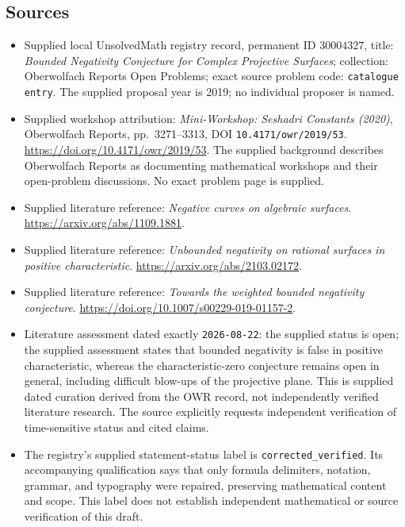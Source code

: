 \documentclass[11pt]{article}
\begin{document}
\subsection{Sources}
\begin{itemize}
\item Supplied local UnsolvedMath registry record, permanent ID \(30004327\), title: \emph{Bounded Negativity Conjecture for Complex Projective Surfaces}; collection: Oberwolfach Reports Open Problems; exact source problem code: \texttt{catalogue entry}. The supplied proposal year is 2019; no individual proposer is named.
\item Supplied workshop attribution: \emph{Mini-Workshop: Seshadri Constants (2020)}, Oberwolfach Reports, pp.\ 3271--3313, DOI \texttt{10.4171/owr/2019/53}. \url{https://doi.org/10.4171/owr/2019/53}. The supplied background describes Oberwolfach Reports as documenting mathematical workshops and their open-problem discussions. No exact problem page is supplied.
\item Supplied literature reference: \emph{Negative curves on algebraic surfaces}. \url{https://arxiv.org/abs/1109.1881}.
\item Supplied literature reference: \emph{Unbounded negativity on rational surfaces in positive characteristic}. \url{https://arxiv.org/abs/2103.02172}.
\item Supplied literature reference: \emph{Towards the weighted bounded negativity conjecture}. \url{https://doi.org/10.1007/s00229-019-01157-2}.
\item Literature assessment dated exactly \texttt{2026-08-22}: the supplied status is open; the supplied assessment states that bounded negativity is false in positive characteristic, whereas the characteristic-zero conjecture remains open in general, including difficult blow-ups of the projective plane. This is supplied dated curation derived from the OWR record, not independently verified literature research. The source explicitly requests independent verification of time-sensitive status and cited claims.
\item The registry's supplied statement-status label is \texttt{corrected\_verified}. Its accompanying qualification says that only formula delimiters, notation, grammar, and typography were repaired, preserving mathematical content and scope. This label does not establish independent mathematical or source verification of this draft.
\end{itemize}
\end{document}

